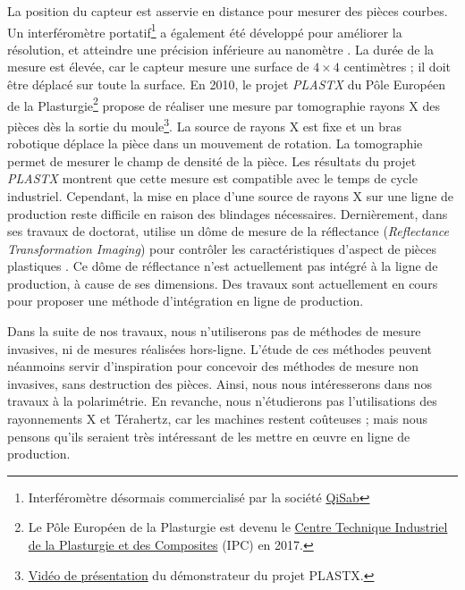 La position du capteur est asservie en distance pour mesurer des pièces courbes.
Un interféromètre portatif\footnote{Interféromètre désormais commercialisé par la société \href{http://qisab.com/}{QiSab}} a également été développé pour améliorer la résolution, et atteindre une précision inférieure au nanomètre \cite{baath_new_2012}.
La durée de la mesure est élevée, car le capteur mesure une surface de $4\times 4$ centimètres ; il doit être déplacé sur toute la surface.
En 2010, le projet \textit{PLASTX} du Pôle Européen de la Plasturgie\footnote{Le Pôle Européen de la Plasturgie est devenu le \href{https://ct-ipc.com/}{Centre Technique Industriel de la Plasturgie et des Composites} (IPC) en 2017.} propose de réaliser une mesure par tomographie rayons X des pièces dès la sortie du moule\footnote{\href{https://vimeo.com/50358748}{Vidéo de présentation} du démonstrateur du projet PLASTX.}.
La source de rayons X est fixe et un bras robotique déplace la pièce dans un mouvement de rotation.
La tomographie permet de mesurer le champ de densité de la pièce.  %
Les résultats du projet \textit{PLASTX} montrent que cette mesure est compatible avec le temps de cycle industriel.
Cependant, la mise en place d'une source de rayons X sur une ligne de production reste difficile en raison des blindages nécessaires.
Dernièrement, dans ses travaux de doctorat, \citeauthor{lacombe_exploitation_2018a} utilise un dôme de mesure de la réflectance (\textit{Reflectance Transformation Imaging}) pour contrôler les caractéristiques d'aspect de pièces plastiques \cite{lacombe_exploitation_2018a}.
Ce dôme de réflectance n'est actuellement pas intégré à la ligne de production, à cause de ses dimensions.
Des travaux sont actuellement en cours pour proposer une méthode d'intégration en ligne de production.

Dans la suite de nos travaux, nous n'utiliserons pas de méthodes de mesure invasives, ni de mesures réalisées hors-ligne.
L'étude de ces méthodes peuvent néanmoins servir d'inspiration pour concevoir des méthodes de mesure non invasives, sans destruction des pièces.
Ainsi, nous nous intéresserons dans nos travaux à la polarimétrie.
En revanche, nous n'étudierons pas l'utilisations des rayonnements X et Térahertz, car les machines restent coûteuses ; mais nous pensons qu'ils seraient très intéressant de les mettre en œuvre en ligne de production.

